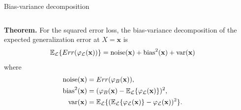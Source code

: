 \documentclass{beamer}
\begin{document}

\begin{frame}{Bias-variance decomposition}

\begin{columns}
\begin{column}{0.65\textwidth}

{\bf Theorem.} For the squared error loss, the bias-variance decomposition of the expected
generalization error at $X=\mathbf{x}$ is
\begin{equation*}
\mathbb{E}_{\cal L} \{ Err(\varphi_{\cal L}(\mathbf{x})) \} = \text{noise}(\mathbf{x}) + \text{bias}^2(\mathbf{x}) + \text{var}(\mathbf{x})
\end{equation*}
where
\begin{align*}
\text{noise}(\mathbf{x}) &= Err(\varphi_B(\mathbf{x})), \\
\text{bias}^2(\mathbf{x}) &= (\varphi_B(\mathbf{x}) - \mathbb{E}_{\cal L} \{ \varphi_{\cal L}(\mathbf{x}) \} )^2, \\
\text{var}(\mathbf{x}) &= \mathbb{E}_{\cal L} \{ (\mathbb{E}_{\cal L} \{ \varphi_{\cal L}(\mathbf{x}) \} - \varphi_{\cal L}(\mathbf{x}))^2 \}.
\end{align*}

\end{column}
\begin{column}{0.35\textwidth}


\end{column}
\end{columns}
\end{frame}
\end{document}
